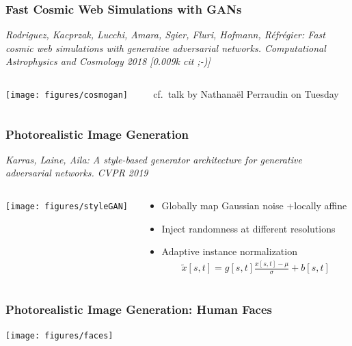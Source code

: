 \documentclass[compress]{beamer}
\newcommand{\is}[1]{\setlength{\itemsep}{#1}}
\begin{document}
\begin{frame} \frametitle{Fast Cosmic Web Simulations with GANs}
{\small \textit{Rodriguez, Kacprzak, Lucchi, Amara,  Sgier, Fluri, Hofmann, R\'efr\'egier: Fast cosmic web simulations with generative adversarial networks. Computational Astrophysics and Cosmology 2018 [0.009k cit ;-)]}}
\begin{columns}
\begin{column}{0.6\textwidth}
\begin{center}
\texttt{[image: figures/cosmogan]}
\end{center}
\end{column}
\begin{column}{0.35\textwidth}
cf.~talk by Nathana\"el Perraudin on Tuesday
\end{column}
\end{columns}
\end{frame}

\begin{frame} \frametitle{Photorealistic Image Generation}
{\small \textit{Karras, Laine, Aila: A style-based generator architecture for generative adversarial networks. CVPR 2019}}\\[1mm]

\begin{columns}
\begin{column}{0.40\textwidth}
\begin{center}
\texttt{[image: figures/styleGAN]}
\end{center}
\end{column}
\begin{column}{0.57\textwidth}
\begin{itemize}\is{2mm}
\item Globally map Gaussian noise +locally affine
\item Inject randomness at different resolutions
\item Adaptive instance normalization
\begin{align*}
\tilde x[s,t]=g[s,t] \frac{x[s,t] - \mu}{\sigma} + b[s,t]
\end{align*}
\end{itemize}
\end{column}
\end{columns}
\end{frame}

\begin{frame} \frametitle{Photorealistic Image Generation: Human Faces}
\begin{center}
\texttt{[image: figures/faces]}
\end{center}
\end{frame}
\end{document}
